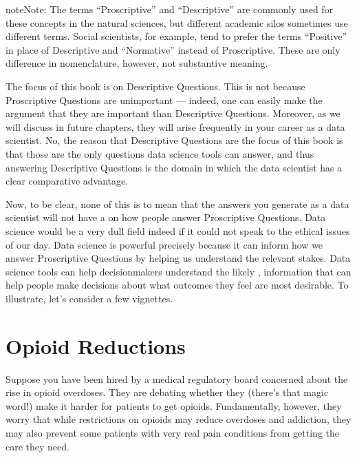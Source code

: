 \documentclass[letterpaper,10pt,english]{jupyterBook}
\begin{document}
\sphinxAtStartPar
{}

\begin{sphinxadmonition}{note}{Note:}
\sphinxAtStartPar
The terms “Proscriptive” and “Descriptive” are commonly used for these concepts in the natural sciences, but different academic silos sometimes use different terms. Social scientists, for example, tend to prefer the terms “Positive” in place of Descriptive and “Normative” instead of Proscriptive. These are only difference in nomenclature, however, not substantive meaning.
\end{sphinxadmonition}

\sphinxAtStartPar
The focus of this book is on Descriptive Questions. This is not because Proscriptive Questions are unimportant — indeed, one can easily make the argument that they are  important than Descriptive Questions. Moreover, as we will discuss in future chapters, they will arise frequently in your career as a data scientist. No, the reason that Descriptive Questions are the focus of this book is that those are the only questions data science tools can answer, and thus answering Descriptive Questions is the domain in which the data scientist has a clear comparative advantage.

\sphinxAtStartPar
Now, to be clear, none of this is to mean that the answers you generate as a data scientist will not have a  on how people answer Proscriptive Questions. Data science would be a very dull field indeed if it could not speak to the ethical issues of our day. Data science is powerful precisely because it can inform how we answer Proscriptive Questions by helping us understand the relevant stakes. Data science tools can help decision\sphinxhyphen{}makers understand the likely , information that can help people make  decisions about what outcomes they feel are most desirable. To illustrate, let’s consider a few vignettes.


\section{Opioid Reductions}
\label{\detokenize{30_questions/05_descriptive_v_proscriptive:opioid-reductions}}
\sphinxAtStartPar
Suppose you have been hired by a medical regulatory board concerned about the rise in opioid overdoses. They are debating whether they  (there’s that magic word!) make it harder for patients to get opioids. Fundamentally, however, they worry that while restrictions on opioids may reduce overdoses and addiction, they may also prevent some patients with very real pain conditions from getting the care they need.
\end{document}
